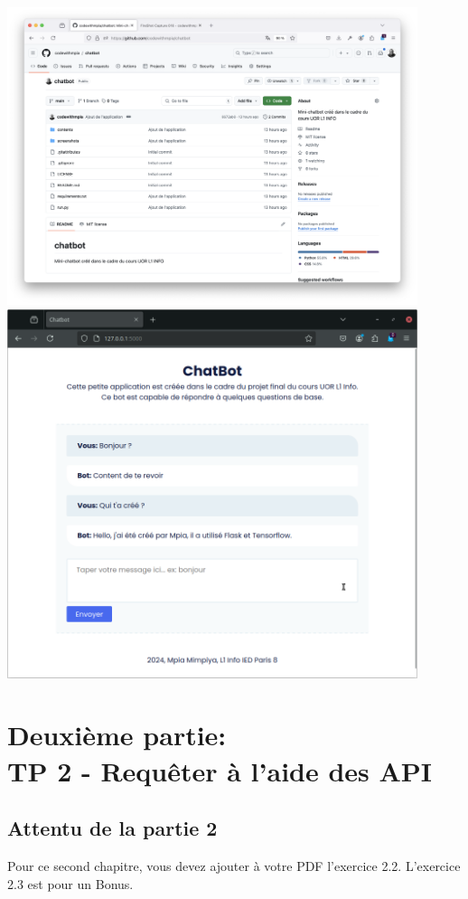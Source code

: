 \documentclass[a4paper,11pt]{article}
\begin{document}
            \includegraphics[width=0.9\textwidth]{TP-1/chatbot.png}\\
            \includegraphics[width=0.9\textwidth]{TP-1/chatbot2.png}

            
    \newpage
    \section{Deuxième partie: \\ TP 2 - Requêter à l’aide des API}
        \subsection{Attentu de la partie 2}
            \noindent Pour ce second chapitre, vous devez ajouter à votre PDF l'exercice 2.2.
            L'exercice 2.3 est pour un Bonus.
\end{document}
